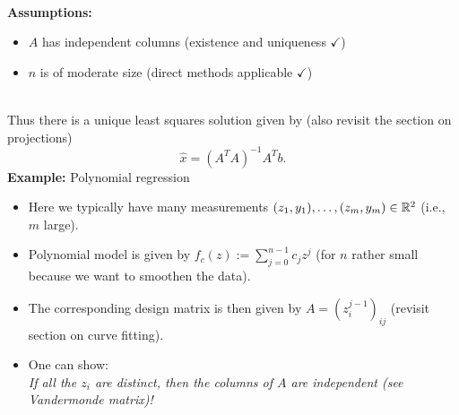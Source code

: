 \begin{frame}
%
~\\
\textbf{Assumptions:} 
\begin{itemize}
	\item $A$ has independent columns (existence and uniqueness $\checkmark$)
	\item $n$ is of moderate size (direct methods applicable $\checkmark$)
\end{itemize}
%
~\\
Thus there is a unique least squares solution given by (also revisit the section on projections)
$$\widehat{x} = (A^TA)^{-1}A^Tb.$$
%
\textbf{Example:} Polynomial regression
\begin{itemize}
	\item Here we typically have many measurements $(z_1, y_1), \ldots, (z_m, y_m) \in {\mathbb{R}}^2$ (i.e., $m$ large).\\
	\item Polynomial model is given by $f_c(z) := \sum_{j=0}^{n-1}c_j z^j$ (for $n$ rather small because we want to smoothen the data).
	\item The corresponding design matrix is then given by $A = (z_i^{j-1})_{ij}$ (revisit section on curve fitting).\\
\item One can show:\\ \textit{\color{satzrot}If all the $z_i$ are distinct, then the columns of $A$ are independent (see \textit{Vandermonde matrix})!}
\end{itemize}

\end{frame}





